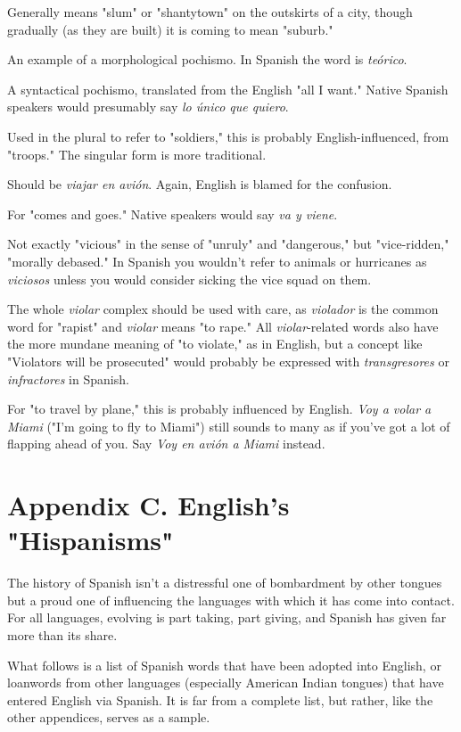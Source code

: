  Generally means "slum" or "shantytown" on the
outskirts of a city, though gradually (as they are built) it is coming to
mean "suburb."

 An example of a morphological pochismo. In
Spanish the word is \emph{teórico}.

 A syntactical pochismo, translated
from the English "all I want." Native Spanish speakers would presumably say \emph{lo único que quiero}.

 Used in the plural to refer to "soldiers," this is
probably English-influenced, from "troops." The singular form is
more traditional.

 Should be \emph{viajar en avión}. Again, English is blamed for the confusion.

 For "comes and goes." Native speakers would say
\emph{va y viene}.

 Not exactly "vicious" in the sense of "unruly" and
"dangerous," but "vice-ridden," "morally debased." In Spanish you
wouldn't refer to animals or hurricanes as \emph{viciosos} unless you would
consider sicking the vice squad on them.

 The whole \emph{violar} complex should be used with
care, as \emph{violador} is the common word for "rapist" and \emph{violar} means
"to rape." All \emph{violar}-related words also have the more mundane meaning of "to violate," as in English, but a concept like "Violators will be
prosecuted" would probably be expressed with \emph{transgresores} or \emph{infractores} in Spanish.

 For "to travel by plane," this is probably influenced
by English. \emph{Voy a volar a Miami} ("I'm going to fly to Miami") still
sounds to many as if you've got a lot of flapping ahead of you. Say \emph{Voy
en avión a Miami} instead.

\chapter{Appendix C. English's "Hispanisms"}

The history of Spanish isn't a distressful one of bombardment
by other tongues but a proud one of influencing the languages with
which it has come into contact. For all languages, evolving is part taking, part giving, and Spanish has given far more than its share.

What follows is a list of Spanish words that have been adopted
into English, or loanwords from other languages (especially American
Indian tongues) that have entered English via Spanish. It is far from a
complete list, but rather, like the other appendices, serves as a sample.

